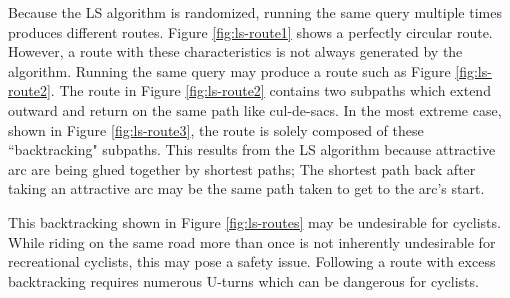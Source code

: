 \documentclass[honors]{union-cs-thesis}
\begin{document}
Because the LS algorithm is randomized, running the same query multiple times produces different routes. Figure \ref{fig:ls-route1} shows a perfectly circular route. However, a route with these characteristics is not always generated by the algorithm. Running the same query may produce a route such as Figure \ref{fig:ls-route2}. The route in Figure \ref{fig:ls-route2} contains two subpaths which extend outward and return on the same path like cul-de-sacs. In the most extreme case, shown in Figure \ref{fig:ls-route3}, the route is solely composed of these ``backtracking" subpaths. This results from the LS algorithm because attractive arc are being glued together by shortest paths; The shortest path back after taking an attractive arc may be the same path taken to get to the arc's start.

This backtracking shown in Figure \ref{fig:ls-routes} may be undesirable for cyclists. While riding on the same road more than once is not inherently undesirable for recreational cyclists, this may pose a safety issue. Following a route with excess backtracking requires numerous U-turns which can be dangerous for cyclists.  
\end{document}
